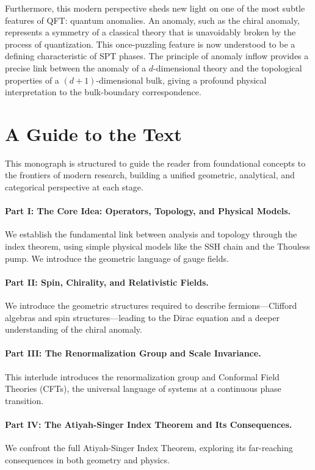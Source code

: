 Furthermore, this modern perspective sheds new light on one of the most subtle features of QFT: quantum anomalies.
An anomaly, such as the chiral anomaly, represents a symmetry of a classical theory that is unavoidably broken by the process of quantization.
This once-puzzling feature is now understood to be a defining characteristic of SPT phases.
The principle of anomaly inflow provides a precise link between the anomaly of a $d$-dimensional theory and the topological properties of a $(d+1)$-dimensional bulk, giving a profound physical interpretation to the bulk-boundary correspondence.

\section{A Guide to the Text}

This monograph is structured to guide the reader from foundational concepts to the frontiers of modern research, building a unified geometric, analytical, and categorical perspective at each stage.
\paragraph{Part I: The Core Idea: Operators, Topology, and Physical Models.} We establish the fundamental link between analysis and topology through the index theorem, using simple physical models like the SSH chain and the Thouless pump. We introduce the geometric language of gauge fields.
\paragraph{Part II: Spin, Chirality, and Relativistic Fields.} We introduce the geometric structures required to describe fermions—Clifford algebras and spin structures—leading to the Dirac equation and a deeper understanding of the chiral anomaly.
\paragraph{Part III: The Renormalization Group and Scale Invariance.} This interlude introduces the renormalization group and Conformal Field Theories (CFTs), the universal language of systems at a continuous phase transition.
\paragraph{Part IV: The Atiyah-Singer Index Theorem and Its Consequences.} We confront the full Atiyah-Singer Index Theorem, exploring its far-reaching consequences in both geometry and physics.
